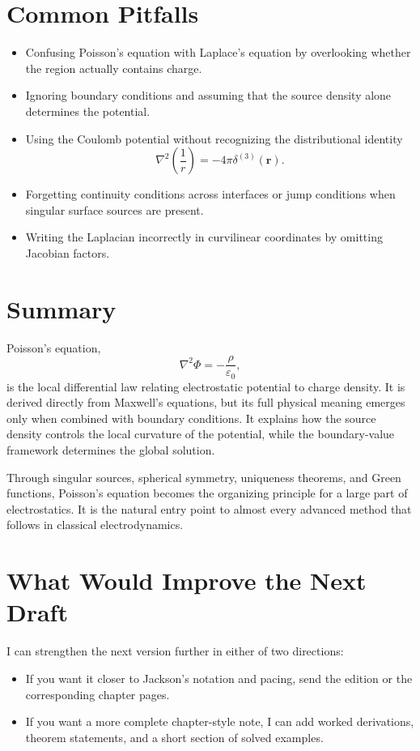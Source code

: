 \documentclass[12pt]{article}
\begin{document}
\section{Common Pitfalls}
\begin{itemize}
\item Confusing Poisson's equation with Laplace's equation by overlooking whether the region actually contains charge.
\item Ignoring boundary conditions and assuming that the source density alone determines the potential.
\item Using the Coulomb potential without recognizing the distributional identity
\[
\nabla^2\left(\frac{1}{r}\right)=-4\pi\delta^{(3)}(\mathbf r).
\]
\item Forgetting continuity conditions across interfaces or jump conditions when singular surface sources are present.
\item Writing the Laplacian incorrectly in curvilinear coordinates by omitting Jacobian factors.
\end{itemize}

\section{Summary}
Poisson's equation,
\[
\nabla^2\Phi=-\frac{\rho}{\varepsilon_0},
\]
is the local differential law relating electrostatic potential to charge density. It is derived directly from Maxwell's equations, but its full physical meaning emerges only when combined with boundary conditions. It explains how the source density controls the local curvature of the potential, while the boundary-value framework determines the global solution.

Through singular sources, spherical symmetry, uniqueness theorems, and Green functions, Poisson's equation becomes the organizing principle for a large part of electrostatics. It is the natural entry point to almost every advanced method that follows in classical electrodynamics.

\section*{What Would Improve the Next Draft}
I can strengthen the next version further in either of two directions:
\begin{itemize}
\item If you want it closer to Jackson's notation and pacing, send the edition or the corresponding chapter pages.
\item If you want a more complete chapter-style note, I can add worked derivations, theorem statements, and a short section of solved examples.
\end{itemize}
\end{document}
